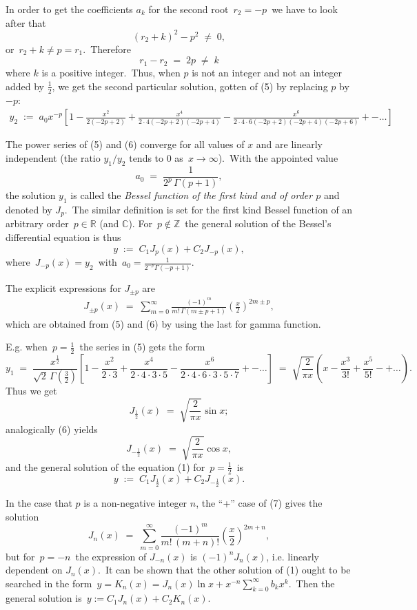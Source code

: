 \documentclass[12pt]{article}
\begin{document}
In order to get the coefficients $a_k$ for the second root\, $r_2 = -p$\, we have to look after that
$$(r_2+k)^2-p^2 \;\neq\; 0,$$
or\, $r_2+k \neq p = r_1$.\, Therefore
$$r_1-r_2 \;=\; 2p \;\neq\; k$$
where $k$ is a positive integer.\, Thus, when $p$ is not an integer and not an integer added by $\frac{1}{2}$, we get the second particular solution, gotten of (5) by replacing $p$ by $-p$:
\begin{align}
 y_2 \;:=\; a_0x^{-p}\!\left[1
\!-\!\frac{x^2}{2(-2p\!+\!2)}\!+\!\frac{x^4}{2\!\cdot\!4(-2p\!+\!2)(-2p\!+\!4)}
\!-\!\frac{x^6}{2\!\cdot\!4\!\cdot\!6(-2p\!+\!2)(-2p\!+\!4)(-2p\!+\!6)}\!+-\ldots\right]
\end{align}

The power series of (5) and (6) converge for all values of $x$ and are linearly independent (the ratio $y_1/y_2$ tends to 0 as\, $x\to\infty$).\, With the appointed value
$$a_0 \;=\; \frac{1}{2^p\,\Gamma(p+1)},$$
the solution $y_1$ is called the {\em Bessel function of the first kind and of order $p$} and denoted by $J_p$.\, The similar definition is set for the first kind Bessel function of an arbitrary order\, $p\in \mathbb{R}$ (and $\mathbb{C}$).
 For\, $p\notin \mathbb{Z}$\, the general solution of the Bessel's differential equation is thus
$$y \;:=\; C_1J_p(x)+C_2J_{-p}(x),$$
where\, $J_{-p}(x) = y_2$\, with\, $a_0 = \frac{1}{2^{-p}\Gamma(-p+1)}$.

The explicit expressions for $J_{\pm p}$ are
\begin{align}
J_{\pm p}(x) \;=\; 
 \sum_{m=0}^\infty 
  \frac{(-1)^m}{m!\,\Gamma(m\pm p+1)}\left(\frac{x}{2}\right)^{2m\pm p},
\end{align}
which are obtained from (5) and (6) by using the last  for gamma function.

E.g. when\, $p = \frac{1}{2}$\, the series in (5) gets the form
$$y_1 \;=\; \frac{x^{\frac{1}{2}}}{\sqrt{2}\,\Gamma(\frac{3}{2})}\left[1\!-\!\frac{x^2}{2\!\cdot\!3}\!+\!\frac{x^4}{2\!\cdot\!4\!\cdot\!3\!\cdot\!5}\!-\!\frac{x^6}{2\!\cdot\!4\cdot\!6\!\cdot\!3\!\cdot\!5\!\cdot\!7}\!+-\ldots\right] \;=\;
\sqrt{\frac{2}{\pi x}}\left(x\!-\!\frac{x^3}{3!}\!+\!\frac{x^5}{5!}\!-+\ldots\right).$$
Thus we get
$$J_{\frac{1}{2}}(x) \;=\; \sqrt{\frac{2}{\pi x}}\sin{x};$$
analogically (6) yields
$$J_{-\frac{1}{2}}(x) \;=\; \sqrt{\frac{2}{\pi x}}\cos{x},$$
and the general solution of the equation (1) for\, $p = \frac{1}{2}$\, is
$$y \;:=\; C_1J_{\frac{1}{2}}(x)+C_2J_{-\frac{1}{2}}(x).$$


In the case that $p$ is a non-negative integer $n$, the ``+'' case of (7) gives the solution
$$J_{n}(x) \;=\; 
 \sum_{m=0}^\infty 
  \frac{(-1)^m}{m!\,(m+n)!}\left(\frac{x}{2}\right)^{2m+n},
$$
but for\, $p = -n$\, the expression of $J_{-n}(x)$ is $(-1)^nJ_n(x)$, i.e. linearly dependent on $J_n(x)$.\, It can be shown that the other solution of (1) ought to be searched in the form\, 
$y = K_n(x) = J_n(x)\ln{x}+x^{-n}\sum_{k=0}^\infty b_kx^k$.\, Then the general solution is\, $y := C_1J_n(x)+C_2K_n(x)$.\\
\end{document}

